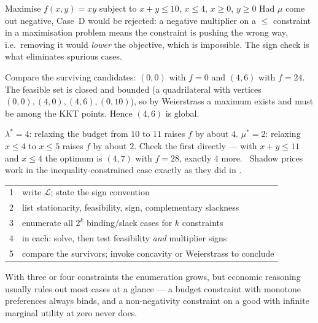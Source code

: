 \begin{worked}{Maximise $f(x,y)=xy$ subject to $x+y\le10$, $x\le4$, $x\ge0$, $y\ge0$}
Had $\mu$ come out negative, Case~D would be rejected: a negative multiplier
on a $\le$ constraint in a maximisation problem means the constraint is
pushing the wrong way, i.e.\ removing it would \emph{lower} the objective,
which is impossible. The sign check is what eliminates spurious cases.

Compare the surviving candidates: $(0,0)$ with $f=0$ and $(4,6)$ with
$f=24$. The feasible set is closed and bounded (a quadrilateral with
vertices $(0,0),(4,0),(4,6),(0,10)$), so by Weierstrass a maximum exists and
must be among the KKT points. Hence $(4,6)$ is global.

$\lambda^{*}=4$: relaxing the budget from $10$ to $11$ raises $f$ by about
$4$. $\mu^{*}=2$: relaxing $x\le4$ to $x\le5$ raises $f$ by about $2$.
Check the first directly --- with $x+y\le11$ and $x\le4$ the optimum is
$(4,7)$ with $f=28$, exactly $4$ more. \checkmark\ Shadow prices work in the
inequality-constrained case exactly as they did in .

\begin{center}\footnotesize
\begin{tabular}{ll}
  \hline
  1 & write $\mathcal L$; state the sign convention\\
  2 & list stationarity, feasibility, sign, complementary slackness\\
  3 & enumerate all $2^{k}$ binding/slack cases for $k$ constraints\\
  4 & in each: solve, then test feasibility \emph{and} multiplier signs\\
  5 & compare the survivors; invoke concavity or Weierstrass to conclude\\
  \hline
\end{tabular}
\end{center}
With three or four constraints the enumeration grows, but economic reasoning
usually rules out most cases at a glance --- a budget constraint with
monotone preferences always binds, and a non-negativity constraint on a good
with infinite marginal utility at zero never does.
\end{worked}

